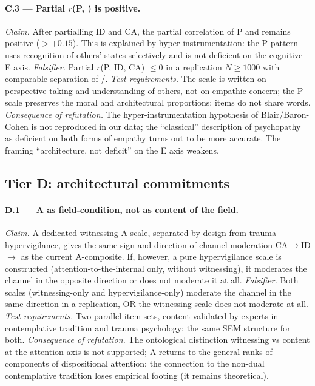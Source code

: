 \paragraph{C.3 --- Partial $r$(P, \Ecog) is positive.}
\emph{Claim.} After partialling ID and CA, the partial correlation of P and \Ecog{} remains positive ($> +0.15$). This is explained by hyper-instrumentation: the P-pattern uses recognition of others' states selectively and is not deficient on the cognitive-E axis.
\emph{Falsifier.} Partial $r$(P, \Ecog{} \textbar{} ID, CA) $\leq 0$ in a replication $N \geq 1000$ with comparable separation of \EAF{}/\Ecog{}.
\emph{Test requirements.} The \Ecog{} scale is written on perspective-taking and understanding-of-others, not on empathic concern; the P-scale preserves the moral and architectural proportions; items do not share words.
\emph{Consequence of refutation.} The hyper-instrumentation hypothesis of Blair/Baron-Cohen is not reproduced in our data; the ``classical'' description of psychopathy as deficient on both forms of empathy turns out to be more accurate. The framing ``architecture, not deficit'' on the E axis weakens.

\subsection{Tier D: architectural commitments}
\label{subsec:falsification_tier_d}

\paragraph{D.1 --- A as field-condition, not as content of the field.}
\emph{Claim.} A dedicated witnessing-A-scale, separated by design from trauma hypervigilance, gives the same sign and direction of channel moderation CA$\to$ID$\to$\EAF{} as the current A-composite. If, however, a pure hypervigilance scale is constructed (attention-to-the-internal only, without witnessing), it moderates the channel in the opposite direction or does not moderate it at all.
\emph{Falsifier.} Both scales (witnessing-only and hypervigilance-only) moderate the channel in the same direction in a replication, OR the witnessing scale does not moderate at all.
\emph{Test requirements.} Two parallel item sets, content-validated by experts in contemplative tradition and trauma psychology; the same SEM structure for both.
\emph{Consequence of refutation.} The ontological distinction witnessing vs content at the attention axis is not supported; A returns to the general ranks of components of dispositional attention; the connection to the non-dual contemplative tradition loses empirical footing (it remains theoretical).

